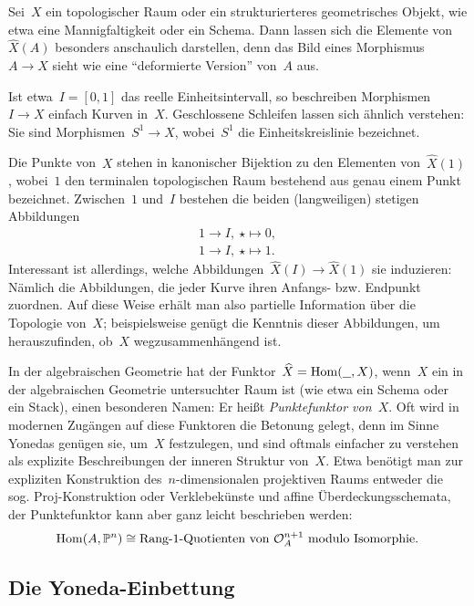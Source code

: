 Sei~$X$ ein topologischer Raum oder ein strukturierteres geometrisches
Objekt, wie etwa eine Mannigfaltigkeit oder ein Schema. Dann lassen sich die Elemente
von~$\widehat X(A)$ besonders anschaulich darstellen, denn das Bild eines
Morphismus~$A \to X$ sieht wie eine "`deformierte Version"' von~$A$ aus.

Ist etwa~$I = [0,1]$ das reelle Einheitsintervall, so beschreiben Morphismen~$I
\to X$ einfach Kurven in~$X$. Geschlossene Schleifen lassen sich ähnlich
verstehen: Sie sind Morphismen~$S^1 \to X$, wobei~$S^1$ die Einheitskreislinie
bezeichnet.

Die Punkte von~$X$ stehen in kanonischer Bijektion zu den Elementen
von~$\widehat X(1)$, wobei~$1$ den terminalen topologischen Raum bestehend aus
genau einem Punkt bezeichnet. Zwischen~$1$ und~$I$ bestehen die beiden
(langweiligen) stetigen Abbildungen
\begin{align*}
  1 \longrightarrow I,\ \star \longmapsto 0, \\
  1 \longrightarrow I,\ \star \longmapsto 1.
\end{align*}
Interessant ist allerdings, welche Abbildungen~$\widehat X(I) \to \widehat X(1)$
sie induzieren: Nämlich die Abbildungen, die jeder Kurve ihren Anfangs- bzw.
Endpunkt zuordnen. Auf diese Weise erhält man also partielle Information über
die Topologie von~$X$; beispielsweise genügt die Kenntnis dieser Abbildungen,
um herauszufinden, ob~$X$ wegzusammenhängend ist.


\begin{bem}In der algebraischen Geometrie hat der Funktor~$\widehat X =
\mathrm{Hom}(\underline{\ \ },X)$, wenn~$X$ ein in der algebraischen Geometrie untersuchter
Raum ist (wie etwa ein Schema oder ein Stack), einen besonderen Namen: Er heißt
\emph{Punktefunktor von~$X$}. Oft wird in modernen Zugängen auf diese Funktoren
die Betonung gelegt, denn im Sinne Yonedas genügen sie, um~$X$
festzulegen, und sind oftmals einfacher zu verstehen als explizite
Beschreibungen der inneren Struktur von~$X$. Etwa benötigt man zur expliziten
Konstruktion des~$n$-dimensionalen projektiven Raums entweder die sog.
Proj-Konstruktion oder Verklebekünste und affine Überdeckungsschemata, der
Punktefunktor kann aber ganz leicht beschrieben werden:
\[ \mathrm{Hom}(A, \mathbb{P}^n) \cong \text{Rang-1-Quotienten von~$\mathcal{O}_A^{n+1}$ modulo
Isomorphie}. \]
\end{bem}


\subsection{Die Yoneda-Einbettung}

